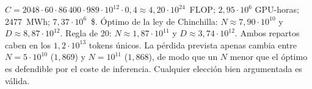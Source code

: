 $C=2048\cdot 60\cdot 86\,400\cdot 989\cdot 10^{12}\cdot 0{,}4\approx 4{,}20\cdot 10^{24}$~FLOP; $2{,}95\cdot 10^{6}$ GPU-horas; 2477~MWh; $7{,}37\cdot 10^{6}$~\$. Óptimo de la ley de Chinchilla: $N\approx 7{,}90\cdot 10^{10}$ y $D\approx 8{,}87\cdot 10^{12}$. Regla de 20: $N\approx 1{,}87\cdot 10^{11}$ y $D\approx 3{,}74\cdot 10^{12}$. Ambos repartos caben en los $1{,}2\cdot 10^{13}$ tokens únicos. La pérdida prevista apenas cambia entre $N=5\cdot 10^{10}$ ($1{,}869$) y $N=10^{11}$ ($1{,}868$), de modo que un $N$ menor que el óptimo es defendible por el coste de inferencia. Cualquier elección bien argumentada es válida.
